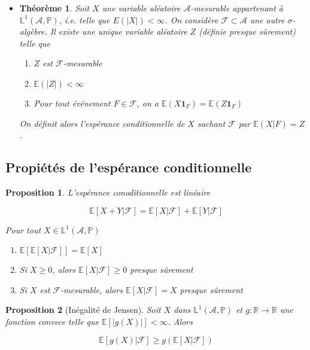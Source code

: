 \documentclass[10pt,a4paper,oneside]{article}
\newtheorem{theoreme}{Théorème}
\newtheorem{proposition}{Proposition}
\begin{document}
\begin{itemize}
\item
\begin{theoreme}
Soit $X$ une variable aléatoire $\mathcal{A}$-mesurable appartenant à $\mathbb{L}^1(\mathcal{A},\mathbb{P})$, i.e. telle que $E(|X|) < \infty$. On considère $\mathcal{F} \subset \mathcal{A}$ une autre $\sigma$-algèbre. Il existe une unique variable aléatoire $Z$ (définie presque sûrement) telle que

\begin{enumerate}
\item
$Z$ est $\mathcal{F}$-mesurable
\item
$\mathbb{E}(|Z|) < \infty$
\item
Pour tout événement $F \in \mathcal{F}$, on a $\mathbb{E}(X \textbf{1}_F) = \mathbb{E}(Z \textbf{1}_F)$
\end{enumerate}

On définit alors l'espérance conditionnelle de $X$ sachant $\mathcal{F}$ par $\mathbb{E}(X | F) = Z$.
\end{theoreme}
\end{itemize}

\subsection{Propiétés de l'espérance conditionnelle}

\begin{proposition}
L'espérance conoditionnelle est linéaire

\[ \mathbb{E}[X + Y | \mathcal{F}] = \mathbb{E}[X | \mathcal{F}] + \mathbb{E}[Y | \mathcal{F}] \]

Pour tout $X \in \mathbb{L}^1(\mathcal{A},\mathbb{P})$

\begin{enumerate}
\item
$\mathbb{E}[ \mathbb{E}[X | \mathcal{F} ] ] = \mathbb{E}[X]$
\item
Si $X \geq 0$, alors $\mathbb{E}[X |\mathcal{F}] \geq 0$ presque sûrement
\item
Si $X$ est $\mathcal{F}$-mesurable, alors $\mathbb{E}[X | \mathcal{F}] = X$ presque sûrement
\end{enumerate}

\end{proposition}

\begin{proposition}[Inégalité de Jensen]
Soit $X$ dans $\mathbb{L}^1(\mathcal{A},\mathbb{P})$ et $g : \mathbb{R} \to \mathbb{R}$ une fonction convece telle que $\mathbb{E}[|g(X)|] < \infty$. Alors

\[ \mathbb{E}[g(X) | \mathcal{F}] \geq g(\mathbb{E}[X | \mathcal{F}]) \]
\end{proposition}
\end{document}
